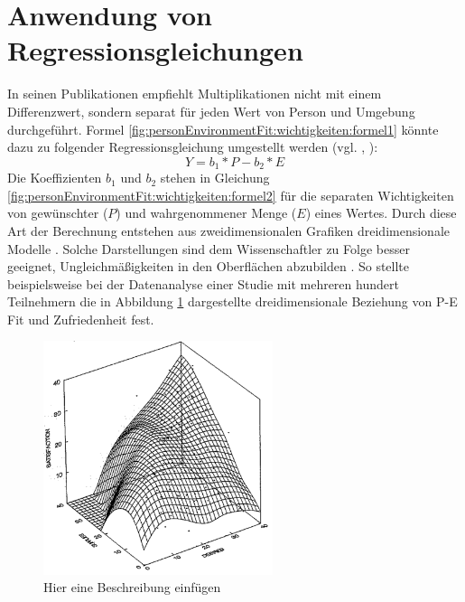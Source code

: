 \section{Anwendung von Regressionsgleichungen}
\label{ch:personEnvironmentFit:regressionsgleichungen}
In seinen Publikationen empfiehlt \textcite[S. 51ff.]{edwards:1991}\cite[S. 9ff.]{edwards:1990}\cite[S. 2ff.]{edwards:1993}\cite[S. 2ff.]{edwards:1993b} Multiplikationen nicht mit einem Differenzwert, sondern separat für jeden Wert von Person und Umgebung durchgeführt. Formel \ref{fig:personEnvironmentFit:wichtigkeiten:formel1} könnte dazu zu folgender Regressionsgleichung umgestellt werden (vgl. \cite[S. 9f.]{edwards:1990}, \cite[S. 2f.]{edwards:1993b}):
\begin{equation}
	Y = b_1 * P - b_2 * E
	\label{fig:personEnvironmentFit:wichtigkeiten:formel2}
\end{equation}
Die Koeffizienten $b_1$ und $b_2$ stehen in Gleichung \ref{fig:personEnvironmentFit:wichtigkeiten:formel2} für die separaten Wichtigkeiten von gewünschter ($P$) und wahrgenommener Menge ($E$) eines Wertes. Durch diese Art der Berechnung entstehen aus zweidimensionalen Grafiken dreidimensionale Modelle \cite[S. 2]{edwards:1993}. Solche Darstellungen sind dem Wissenschaftler zu Folge besser geeignet, Ungleichmäßigkeiten in den Oberflächen abzubilden \cite[S. 51ff.]{edwards:1991}. So stellte \textcite[S. 53ff.]{edwards:1991} beispielsweise bei der Datenanalyse einer Studie mit mehreren hundert Teilnehmern die in Abbildung \ref{fig:personEnvironmentFit:wichtigkeiten:abb2} dargestellte dreidimensionale Beziehung von P-E Fit und Zufriedenheit fest.\\
\begin{figure}[h]
	\centering
	\includegraphics[width=0.6\textwidth]{gfx/drei_d_modell.png}
	\caption{Hier eine Beschreibung einfügen \cite[S. 57]{edwards:1991}}
	\label{fig:personEnvironmentFit:wichtigkeiten:abb2}
\end{figure}\\
